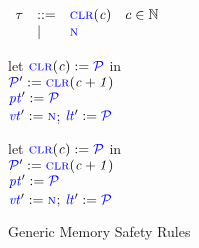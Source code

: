 \documentclass{llncs}
\begin{document}
\begin{figure}[t]
  \color{blue}
  \begin{minipage}{0.3\textwidth}
    \(\begin{array}{lllr}
      \tau & ::= & \clr & c \in \mathbb{N} \\
      & | & \N \\
    \end{array}\)
  \end{minipage}
  \scriptsize
  \begin{minipage}{0.22\textwidth}
    \localtruleblock
        {let \(\clr := \PCT\) in \\
          \(\PCT' := \clr[c+1]\) \\
          \(\pt' := \PCT\)\\
          \(\vt' := \N\);
          \(\lt' := \PCT\)
        }
  \end{minipage}
  \begin{minipage}{0.2\textwidth}
    \malloctruleblock
        {let \(\clr := \PCT\) in \\
          \(\PCT' := \clr[c+1]\) \\
          \(\pt' := \PCT\) \\
          \(\vt' := \N\);
          \(\lt' := \PCT\)
        }
  \end{minipage}

  \caption{Generic Memory Safety Rules}
  \label{fig:memgen}
\end{figure}
\end{document}
